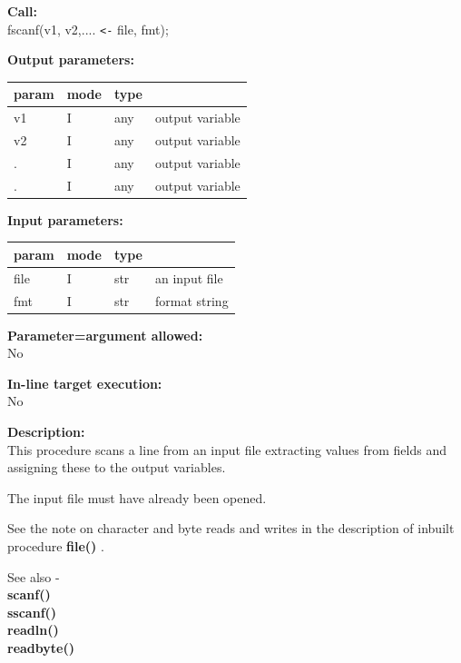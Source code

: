         {\bf Call:} \\
        fscanf(v1, v2,.... \verb'<-' file, fmt);
        
        {\bf Output parameters:} \\
        \begin{tabular}{| l | l | l | l |}
        \hline
        param  & mode     & type  & \\
        \hline \hline
        v1 & I & any & output variable  \\ \hline
        v2 & I & any & output variable  \\ \hline
        .  & I & any & output variable  \\ \hline
        .  & I & any & output variable  \\ \hline
        \end{tabular}
        
        {\bf Input parameters:} \\
        \begin{tabular}{| l | l | l | l |}
        \hline
        param  & mode     & type  & \\
        \hline \hline
        file & I & str & an input file  \\ \hline
        fmt  & I & str & format string  \\ \hline
        \end{tabular}
        
        {\bf Parameter=argument allowed:} \\
        No
        
        {\bf In-line target execution:} \\
        No
        
        {\bf Description:} \\
        This procedure scans a line from an input file extracting values from fields
        and assigning these to the output variables.
        
        The input file must have already been opened.
        
        
        
        See the note on character and byte reads and writes in the description
        of inbuilt procedure {\bf file()} .
       
        See also - \\
        {\bf scanf()}  \\
        {\bf sscanf()}  \\
        {\bf readln()}  \\
        {\bf readbyte()} 





